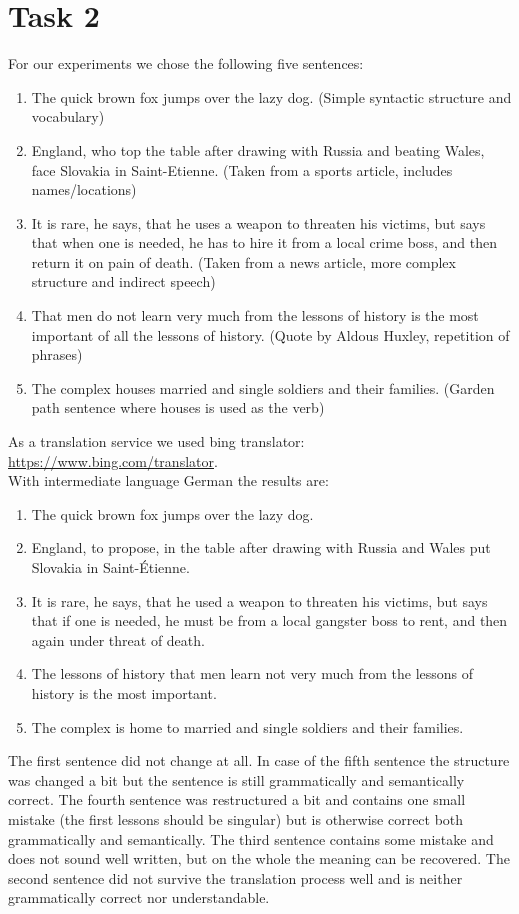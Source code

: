 \documentclass[%
   11pt,              %
   ngerman,           %
   a4paper,           %
   DIV11,             %
]{scrartcl}%
\begin{document}
\section*{Task 2}
For our experiments we chose the following five sentences:
\begin{enumerate}
	\item The quick brown fox jumps over the lazy dog. (Simple syntactic structure and vocabulary)
	\item England, who top the table after drawing with Russia and beating Wales, face Slovakia in Saint-Etienne. (Taken from a sports article, includes names/locations)
	\item It is rare, he says, that he uses a weapon to threaten his victims, but says that when one is needed, he has to hire it from a local crime boss, and then return it on pain of death. (Taken from a news article, more complex structure and indirect speech)
	\item That men do not learn very much from the lessons of history is the most important of all the lessons of history. (Quote by Aldous Huxley, repetition of phrases)
	\item The complex houses married and single soldiers and their families. (Garden path sentence where houses is used as the verb)
\end{enumerate}
As a translation service we used bing translator: \url{https://www.bing.com/translator}. \\
With intermediate language German the results are:
\begin{enumerate}
	\item The quick brown fox jumps over the lazy dog.
	\item England, to propose, in the table after drawing with Russia and Wales put Slovakia in Saint-Étienne.
	\item It is rare, he says, that he used a weapon to threaten his victims, but says that if one is needed, he must be from a local gangster boss to rent, and then again under threat of death.
	\item The lessons of history that men learn not very much from the lessons of history is the most important.
	\item The complex is home to married and single soldiers and their families.
\end{enumerate}
The first sentence did not change at all. In case of the fifth sentence the structure was changed a bit but the sentence is still grammatically and semantically correct. The fourth sentence was restructured a bit and contains one small mistake (the first lessons should be singular) but is otherwise correct both grammatically and semantically. The third sentence contains some mistake and does not sound well written, but on the whole the meaning can be recovered. The second sentence did not survive the translation process well and is neither grammatically correct nor understandable. \par
\end{document}
